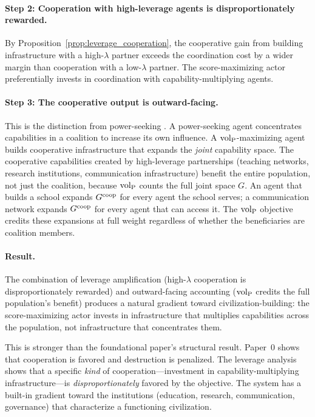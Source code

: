 \paragraph{Step 2: Cooperation with high-leverage agents is disproportionately
rewarded.} By Proposition~\ref{prop:leverage_cooperation}, the cooperative gain
from building infrastructure with a high-$\lambda$ partner exceeds the
coordination cost by a wider margin than cooperation with a low-$\lambda$
partner. The score-maximizing actor preferentially invests in coordination
with capability-multiplying agents.

\paragraph{Step 3: The cooperative output is outward-facing.} This is the
distinction from power-seeking \citep{turner2021optimal}. A power-seeking agent
concentrates capabilities in a coalition to increase its own influence. A ${\operatorname{vol}_{\mathrm{P}}}$-maximizing agent builds
cooperative infrastructure that expands the \emph{joint} capability space. The
cooperative capabilities created by high-leverage partnerships (teaching
networks, research institutions, communication infrastructure) benefit the
entire population, not just the coalition, because ${\operatorname{vol}_{\mathrm{P}}}$ counts the full
joint space $G$. An agent that builds a school expands $G^{\mathrm{coop}}$ for every agent
the school serves; a communication network expands $G^{\mathrm{coop}}$ for every agent
that can access it. The ${\operatorname{vol}_{\mathrm{P}}}$ objective credits these expansions at full
weight regardless of whether the beneficiaries are coalition members.

\paragraph{Result.} The combination of leverage amplification (high-$\lambda$
cooperation is disproportionately rewarded) and outward-facing accounting
(${\operatorname{vol}_{\mathrm{P}}}$ credits the full population's benefit) produces a natural gradient
toward civilization-building: the score-maximizing actor invests in
infrastructure that multiplies capabilities across the population, not
infrastructure that concentrates them.

This is stronger than the foundational paper's structural result. Paper~0 shows
that cooperation is favored and destruction is penalized. The leverage analysis
shows that a specific \emph{kind} of cooperation---investment in
capability-multiplying infrastructure---is \emph{disproportionately} favored
by the objective. The system has a built-in gradient toward the institutions
(education, research, communication, governance) that characterize a
functioning civilization.
